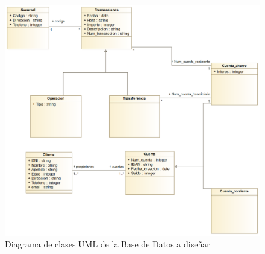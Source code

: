 \documentclass{article}
\begin{document}
\begin{figure}[h!]
	\centering
		\includegraphics[scale=0.4]{images/diagramauml.png}
			\caption{Diagrama de clases UML de la Base de Datos a diseñar}
			\label{FIG:diagramaUML}
\end{figure}
\end{document}
